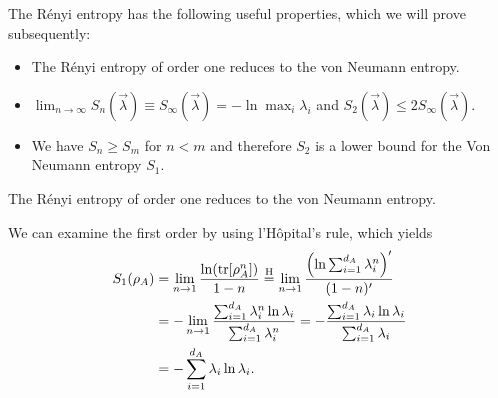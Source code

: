 \documentclass[../../main.tex]{subfiles}
\begin{document}
The Rényi entropy has the following useful properties, which we will prove subsequently:
\begin{itemize}
      \item The Rényi entropy of order one reduces to the von Neumann entropy.
      \item $\lim_{n \to \infty} S_n (\vec \lambda) \equiv S_\infty (\vec \lambda)= - \ln \max_i \lambda_i$ and $S_2(\vec \lambda) \leq 2 S_\infty(\vec \lambda)$.
      \item We have $S_n \geq S_m$ for $n<m$ and therefore $S_2$ is a lower bound for the Von Neumann entropy $S_1$.
\end{itemize}

\begin{claim}
The Rényi entropy of order one reduces to the von Neumann entropy.
\end{claim}
\begin{claimproof}
      We can examine the first order by using l'Hôpital's rule, which yields
      \begin{align*}
            S_1(\rho_A) &= \lim_{n \to 1} \frac{\ln (\operatorname{tr}[\rho_A^n])}{1-n} 
            \overset{\mathrm{H}}{=} \lim_{n \to 1} \frac{\left( \ln \sum_{i=1}^{d_A} \lambda_i^n \right)'}{(1-n)'} \\
            &= - \lim_{n \to 1} \frac{\sum_{i=1}^{d_A} \lambda_i^n \ln \lambda_i }{\sum_{i=1}^{d_A} \lambda_i^n} 
            = - \frac{\sum_{i=1}^{d_A} \lambda_i \ln \lambda_i }{\sum_{i=1}^{d_A} \lambda_i} \\
            &= - \sum_{i=1}^{d_A} \lambda_i \ln \lambda_i .
      \end{align*}
\end{claimproof}
\end{document}
